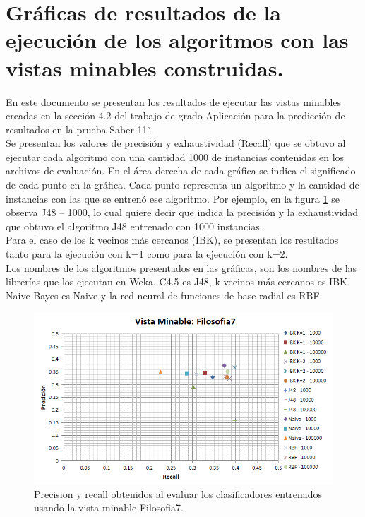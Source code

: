 \documentclass{article}
\newcommand{\degree}{\ensuremath{^\circ}}
\begin{document}
\section*{Gráficas de resultados de la ejecución de los algoritmos con las vistas minables construidas.}
En este documento se presentan los resultados de ejecutar las vistas minables creadas en la sección 4.2 del trabajo de grado Aplicación para la predicción de resultados en la prueba Saber 11\degree.\\

Se presentan los valores de precisión y exhaustividad (Recall) que se obtuvo al ejecutar cada algoritmo con una cantidad 1000 de instancias contenidas en los archivos de evaluación. En el área derecha de cada gráfica se indica el significado de cada punto en la gráfica. Cada punto representa un algoritmo y la cantidad de instancias con las que se entrenó ese algoritmo. Por ejemplo, en la figura \ref{fig:figura1} se observa J48 – 1000, lo cual quiere decir que indica la precisión y la exhaustividad que obtuvo el algoritmo J48 entrenado con 1000 instancias.\\

Para el caso de los k vecinos más cercanos (IBK), se presentan los resultados tanto para la ejecución con k=1 como para la ejecución con k=2.\\

Los nombres de los algoritmos presentados en las gráficas, son los nombres de las librerías que los ejecutan en Weka. C4.5 es J48, k vecinos más cercanos es IBK, Naive Bayes es Naive y la red neural de funciones de base radial es RBF.\\
\begin{figure}[!htb]
\begin{centering}
\includegraphics[scale=0.8]{filosofia7}
\par\end{centering}
\caption{Precision y recall obtenidos al evaluar los clasificadores entrenados usando la vista minable Filosofia7.}
\label{fig:figura1}
\end{figure}
\end{document}
